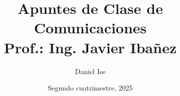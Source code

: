 \documentclass[10pt]{article}
\title{Apuntes de Clase de Comunicaciones\\Prof.: Ing. Javier Ibañez}
\author{Daniel Ise}
\date{Segundo cuatrimestre, 2025}
\begin{document}
\maketitle
\pagebreak

\tableofcontents
\pagebreak


\end{document}
